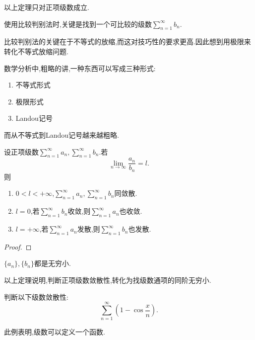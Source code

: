\begin{remark}
    以上定理只对正项级数成立.
\end{remark}

使用比较判别法时,关键是找到一个可比较的级数$\sum_{n=1}^\infty b_n$.

\begin{note}
    比较判别法的关键在于不等式的放缩,而这对技巧性的要求更高.因此想到用极限来转化不等式放缩问题.
\end{note}

\begin{note}
    数学分析中,粗略的讲,一种东西可以写成三种形式:
    \begin{enumerate}
        \item 不等式形式
        \item 极限形式
        \item Landou记号
    \end{enumerate}
    而从不等式到Landou记号越来越粗略.
\end{note}

\begin{theorem}[比较判别法的极限形式]
    设正项级数$\sum_{n=1}^\infty a_n,\sum_{n=1}^\infty b_n.$若
    \[\lim_{n\to\infty}\frac{a_n}{b_n}=l.\]
    则
    \begin{enumerate}
        \item $0<l<+\infty$,$\sum_{n=1}^\infty a_n,\sum_{n=1}^\infty b_n$同敛散.
        \item $l=0$,若$\sum_{n=1}^\infty b_n$收敛,则$\sum_{n=1}^\infty a_n$也收敛.
        \item $l=+\infty$,若$\sum_{n=1}^\infty a_n$发散,则$\sum_{n=1}^\infty b_n$也发散.
    \end{enumerate}
\end{theorem}

\begin{proof}%
    
\end{proof}

\begin{note}
    $\{a_n\},\{b_n\}$都是无穷小.
\end{note}

以上定理说明,判断正项级数敛散性,转化为找级数通项的同阶无穷小.

\begin{example}
    判断以下级数敛散性:
    \[\sum_{n=1}^\infty (1-\cos\frac{x}{n}).\]
\end{example}

\begin{remark}
    此例表明,级数可以定义一个函数.
\end{remark}

